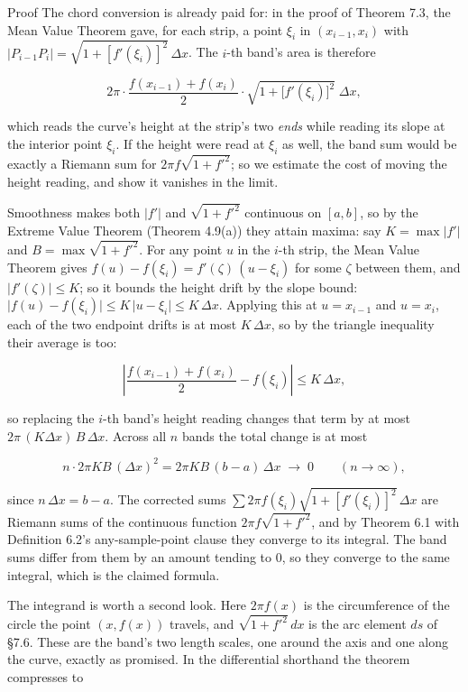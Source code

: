 \documentclass[a4paper,12pt,oneside]{memoir}
\begin{document}
\begin{envproof}{Proof}{}{}
The chord conversion is already paid for: in the proof of Theorem 7.3, the Mean Value Theorem gave, for each strip, a point \(\xi_i\) in \((x_{i-1}, x_i)\) with \(\lvert P_{i-1}P_i\rvert = \sqrt{1 + [f'(\xi_i)]^{2}}\,\Delta x\). The \(i\)-th band’s area is therefore

\[ 2\pi\cdot\frac{f(x_{i-1}) + f(x_i)}{2}\cdot\sqrt{1 + \bigl[f'(\xi_i)\bigr]^{2}}\;\Delta x, \]

which reads the curve’s height at the strip’s two \emph{ends} while reading its slope at the interior point \(\xi_i\). If the height were read at \(\xi_i\) as well, the band sum would be exactly a Riemann sum for \(2\pi f\sqrt{1 + f'^{2}}\); so we estimate the cost of moving the height reading, and show it vanishes in the limit.

Smoothness makes both \(\lvert f'\rvert\) and \(\sqrt{1 + f'^{2}}\) continuous on \([a, b]\), so by the Extreme Value Theorem (Theorem 4.9(a)) they attain maxima: say \(K = \max \lvert f'\rvert\) and \(B = \max \sqrt{1 + f'^{2}}\). For any point \(u\) in the \(i\)-th strip, the Mean Value Theorem gives \(f(u) - f(\xi_i) = f'(\zeta)\,(u - \xi_i)\) for some \(\zeta\) between them, and \(\lvert f'(\zeta)\rvert \le K\); so it bounds the height drift by the slope bound: \(\lvert f(u) - f(\xi_i)\rvert \le K\,\lvert u - \xi_i\rvert \le K\,\Delta x\). Applying this at \(u = x_{i-1}\) and \(u = x_i\), each of the two endpoint drifts is at most \(K\,\Delta x\), so by the triangle inequality their average is too:

\[ \left\lvert \frac{f(x_{i-1}) + f(x_i)}{2} - f(\xi_i) \right\rvert \le K\,\Delta x, \]

so replacing the \(i\)-th band’s height reading changes that term by at most \(2\pi\,(K \Delta x)\,B\,\Delta x\). Across all \(n\) bands the total change is at most

\[ n \cdot 2\pi K B\,(\Delta x)^{2} = 2\pi K B\,(b - a)\,\Delta x \;\longrightarrow\; 0 \qquad (n \to \infty), \]

since \(n\,\Delta x = b - a\). The corrected sums \(\sum 2\pi f(\xi_i)\sqrt{1 + [f'(\xi_i)]^{2}}\,\Delta x\) are Riemann sums of the continuous function \(2\pi f \sqrt{1 + f'^{2}}\), and by Theorem 6.1 with Definition 6.2’s any-sample-point clause they converge to its integral. The band sums differ from them by an amount tending to \(0\), so they converge to the same integral, which is the claimed formula. \qedmark
\end{envproof}
The integrand is worth a second look. Here \(2\pi f(x)\) is the circumference of the circle the point \((x, f(x))\) travels, and \(\sqrt{1 + f'^{2}}\,dx\) is the arc element \(ds\) of §7.6. These are the band’s two length scales, one around the axis and one along the curve, exactly as promised. In the differential shorthand the theorem compresses to
\end{document}
